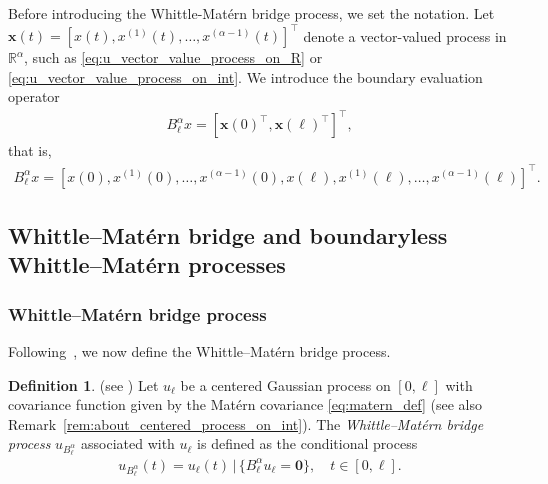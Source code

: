 \documentclass[11pt,a4paper]{article}
\theoremstyle{plain}
\theoremstyle{definition}
\newtheorem{definition}[theorem]{Definition}
\begin{document}
Before introducing the Whittle-Matérn bridge process, we set the notation. Let $\boldsymbol{x}(t) = [x(t), x^{(1)}(t), \dots, x^{(\alpha-1)}(t)]^\top$ denote a vector-valued process in $\mathbb{R}^\alpha$, such as \eqref{eq:u_vector_value_process_on_R} or \eqref{eq:u_vector_value_process_on_int}. We introduce the boundary evaluation operator
\begin{align*}
    B_{\ell}^\alpha x = [\boldsymbol{x}(0)^\top, \boldsymbol{x}(\ell)^\top]^\top,
\end{align*}
that is,
\begin{align*}
    B_{\ell}^\alpha x
    =
    [x(0), x^{(1)}(0), \dots, x^{(\alpha-1)}(0),
    x(\ell), x^{(1)}(\ell), \dots, x^{(\alpha-1)}(\ell)]^\top.
\end{align*}

\subsection{Whittle--Matérn bridge and boundaryless Whittle--Matérn processes}
\label{sec:bridge_and_boundaryless_process_def}
\subsubsection{Whittle--Matérn bridge process}
Following~\cite[Section 4]{Bolin2023Statistical}, we now define the Whittle--Matérn bridge process.
\begin{definition}
\label{def_whittle_matern_bridge_process}
\textnormal{(see \cite[Definition~1]{Bolin2023Statistical})}
    Let $u_{\ell}$ be a centered Gaussian process on $[0,\ell]$ with covariance function given by the Matérn covariance \eqref{eq:matern_def} (see also Remark~\ref{rem:about_centered_process_on_int}). The \emph{Whittle--Matérn bridge process} $u_{B_{\ell}^\alpha}$ associated with $u_{\ell}$ is defined as the conditional process
    \begin{align*}
        u_{B_{\ell}^\alpha}(t)
        =
        u_{\ell}(t) \,\big|\, \{B_{\ell}^\alpha u_{\ell} = \mathbf{0}\},
        \quad t \in [0,\ell].
    \end{align*}
\end{definition}
\end{document}

